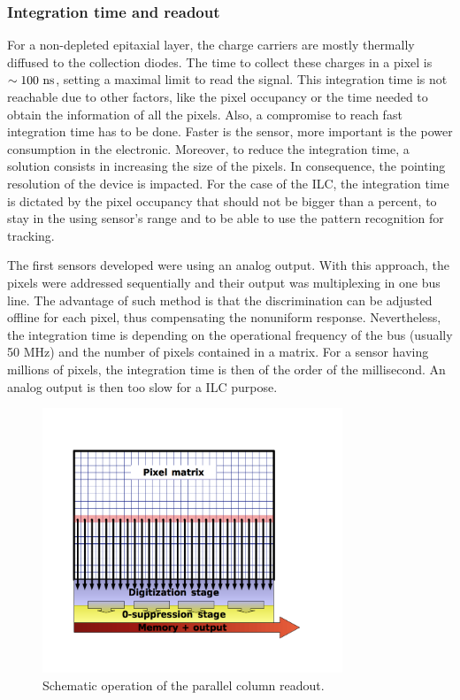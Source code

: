     \subsubsection{Integration time and readout}

    For a non-depleted epitaxial layer, the charge carriers are mostly thermally diffused to the collection diodes.
    The time to collect these charges in a pixel is $\sim 100~\rm{ns}$, setting a maximal limit to read the signal.
    This integration time is not reachable due to other factors, like the pixel occupancy or the time needed to obtain the information of all the pixels.
    Also, a compromise to reach fast integration time has to be done.
    Faster is the sensor, more important is the power consumption in the electronic.
    Moreover, to reduce the integration time, a solution consists in increasing the size of the pixels.
    In consequence, the pointing resolution of the device is impacted.
    For the case of the \gls{ILC}, the integration time is dictated by the pixel occupancy that should not be bigger than a percent, to stay in the using sensor's range and to be able to use the pattern recognition for tracking.

    The first sensors developed were using an analog output.
    With this approach, the pixels were addressed sequentially and their output was multiplexing in one bus line.
    The advantage of such method is that the discrimination can be adjusted offline for each pixel, thus compensating the nonuniform response.
    Nevertheless, the integration time is depending on the operational frequency of the bus (usually 50 MHz) and the number of pixels contained in a matrix.
    For a sensor having millions of pixels, the integration time is then of the order of the millisecond.
    An analog output is then too slow for a \gls{ILC} purpose. 
    
    \begin{figure}[!h]
      \centering
      \includegraphics[width = 0.8\textwidth]{Pictures/vxd/parallelColumnPrinciple_2bis.png}
      \caption{Schematic operation of the parallel column readout.}
      \label{fig:rollShut}
    \end{figure}
    
